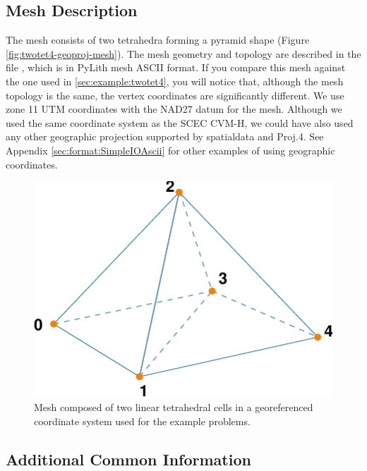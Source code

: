 \subsection{Mesh Description}

The mesh consists of two tetrahedra forming a pyramid shape (Figure
\vref{fig:twotet4-geoproj-mesh}). The mesh geometry and topology are
described in the file , which is in PyLith mesh
ASCII format. If you compare this mesh against the one used in \vref{sec:example:twotet4},
you will notice that, although the mesh topology is the same, the
vertex coordinates are significantly different. We use zone 11 UTM
coordinates with the NAD27 datum for the mesh. Although we used the
same coordinate system as the SCEC CVM-H, we could have also used
any other geographic projection supported by spatialdata and Proj.4.
See Appendix \vref{sec:format:SimpleIOAscii} for other examples
of using geographic coordinates. 

\begin{figure}
  \includegraphics{examples/figs/twotet4-mesh}
  \caption{Mesh composed of two linear tetrahedral cells in a
    georeferenced coordinate system used for the example problems.}
  \label{fig:twotet4-geoproj-mesh}
\end{figure}

\subsection{Additional Common Information}

